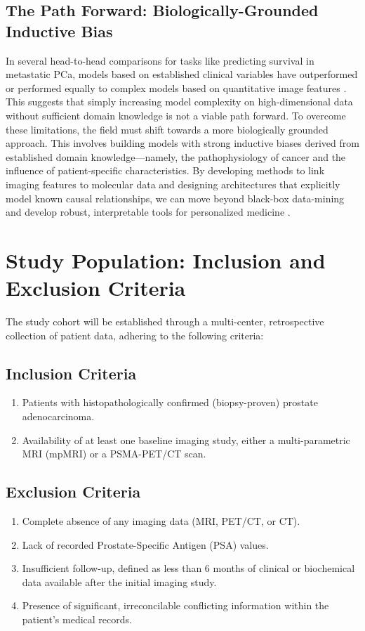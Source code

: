 \documentclass[11pt, a4paper]{article}
\begin{document}
\subsection{The Path Forward: Biologically-Grounded Inductive Bias}
In several head-to-head comparisons for tasks like predicting survival in metastatic PCa, models based on established clinical variables have outperformed or performed equally to complex models based on quantitative image features \cite{MolinBarry2024, MolinBarry2025}. This suggests that simply increasing model complexity on high-dimensional data without sufficient domain knowledge is not a viable path forward. To overcome these limitations, the field must shift towards a more biologically grounded approach. This involves building models with strong inductive biases derived from established domain knowledge—namely, the pathophysiology of cancer and the influence of patient-specific characteristics. By developing methods to link imaging features to molecular data \cite{FerroCobelli2022, HuynhSwanson2024} and designing architectures that explicitly model known causal relationships, we can move beyond black-box data-mining and develop robust, interpretable tools for personalized medicine \cite{MolinBarry2025, GhezzoBezzi2022}.

\section{Study Population: Inclusion and Exclusion Criteria}
The study cohort will be established through a multi-center, retrospective collection of patient data, adhering to the following criteria:

\subsection{Inclusion Criteria}
\begin{enumerate}
    \item Patients with histopathologically confirmed (biopsy-proven) prostate adenocarcinoma.
    \item Availability of at least one baseline imaging study, either a multi-parametric MRI (mpMRI) or a PSMA-PET/CT scan.
\end{enumerate}

\subsection{Exclusion Criteria}
\begin{enumerate}
    \item Complete absence of any imaging data (MRI, PET/CT, or CT).
    \item Lack of recorded Prostate-Specific Antigen (PSA) values.
    \item Insufficient follow-up, defined as less than 6 months of clinical or biochemical data available after the initial imaging study.
    \item Presence of significant, irreconcilable conflicting information within the patient's medical records.
\end{enumerate}
\end{document}
